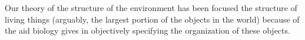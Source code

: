 \begin{article}






\title{ }

\authors{ }
\email{}

\affil{ }

\editor{ }

\abstract{ }

\keywords{}

\section{ }







\end{article}




\section{ }
\subsection{ }
\subsubsection{ }
Our theory of the structure of the environment has been focused the
structure of living things (arguably, the largest portion of the
objects in the world) because of the aid biology gives in objectively
specifying the organization of these objects.

